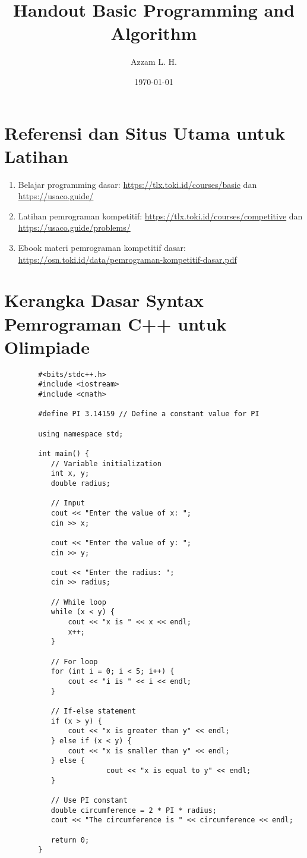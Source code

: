 
	\title{Handout Basic Programming and Algorithm} %
	\date{\today}
	\author{Azzam L. H.}
	\maketitle

 \renewcommand*\contentsname{Daftar Isi}
\tableofcontents
	\noindent
	\section{Referensi dan Situs Utama untuk Latihan}
	\begin{enumerate}
	\item Belajar programming dasar:           \url{https://tlx.toki.id/courses/basic} dan \url{https://usaco.guide/}
	\item Latihan pemrograman kompetitif: \url{https://tlx.toki.id/courses/competitive} dan \url{https://usaco.guide/problems/}
	\item Ebook materi pemrograman kompetitif dasar: \url{https://osn.toki.id/data/pemrograman-kompetitif-dasar.pdf}
	\end{enumerate}
	
	\section{Kerangka Dasar Syntax Pemrograman C++ untuk Olimpiade}
	\begin{lstlisting}
		#<bits/stdc++.h>
		#include <iostream>
		#include <cmath>
		
		#define PI 3.14159 // Define a constant value for PI
		
		using namespace std;
		
		int main() {
		   // Variable initialization
		   int x, y;
		   double radius;
				
		   // Input
		   cout << "Enter the value of x: ";
		   cin >> x;
				
		   cout << "Enter the value of y: ";
		   cin >> y;
				
		   cout << "Enter the radius: ";
		   cin >> radius;
				
		   // While loop
		   while (x < y) {
		       cout << "x is " << x << endl;
		       x++;
		   }
				
		   // For loop
		   for (int i = 0; i < 5; i++) {
		       cout << "i is " << i << endl;
		   }
				
		   // If-else statement
		   if (x > y) {
		       cout << "x is greater than y" << endl;
		   } else if (x < y) {
		       cout << "x is smaller than y" << endl;
		   } else {
				    	cout << "x is equal to y" << endl;
		   }
				
		   // Use PI constant
		   double circumference = 2 * PI * radius;
		   cout << "The circumference is " << circumference << endl;
				
		   return 0;
		}
		\end{lstlisting}
	
